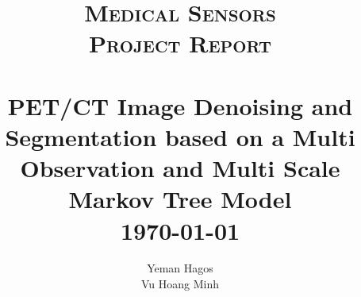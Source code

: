 \title{ \textsc{Medical Sensors}
		\\ [0.5cm] 
		\normalsize \textsc{Project Report}
		\\
		[2.0cm]
		\HRule{0.5pt} \\
		\LARGE \textbf{PET/CT Image Denoising and Segmentation based on a Multi Observation and Multi Scale Markov Tree Model}
		\HRule{2pt} \\ [0.5cm]
		\normalsize \today \vspace*{5\baselineskip}}

\date{}

\author{
		Yeman Hagos \\
		Vu Hoang Minh \\ }

\maketitle
\tableofcontents
\newpage

\sectionfont{\scshape}
